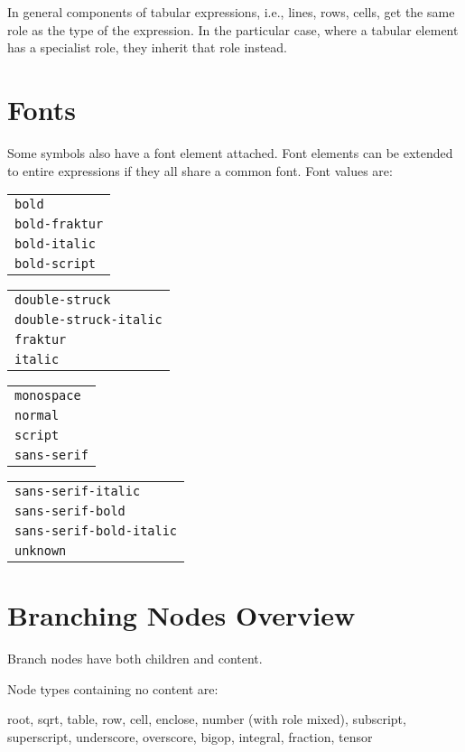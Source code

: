\documentclass{article}
\begin{document}
In general components of tabular expressions, i.e., lines, rows, cells, get the
same role as the type of the expression. In the particular case, where a tabular
element has a specialist role, they inherit that role instead.

\section{Fonts}
\label{sec:fonts}

Some symbols also have a font element attached. Font elements can be extended to
entire expressions if they all share a common font. Font values are:\vspace*{.5cm}

\noindent
\begin{tabular}{>{\tt}l}
  bold\\
  bold-fraktur\\
  bold-italic\\
  bold-script
\end{tabular}\quad
\begin{tabular}{>{\tt}l}
  double-struck\\
  double-struck-italic\\
  fraktur\\
  italic\\
\end{tabular}\quad
\begin{tabular}{>{\tt}l}
  monospace\\
  normal\\
  script\\
  sans-serif\\
\end{tabular}\quad
\begin{tabular}{>{\tt}l}
  sans-serif-italic\\
  sans-serif-bold\\
  sans-serif-bold-italic\\
  unknown
\end{tabular}

\section{Branching Nodes Overview}
\label{sec:branching-nodes-overview}

Branch nodes have both children and content. 

Node types containing no content are: 

root, sqrt, table, row, cell, enclose, number (with role mixed), subscript,
superscript, underscore, overscore, bigop, integral, fraction, tensor
\end{document}

